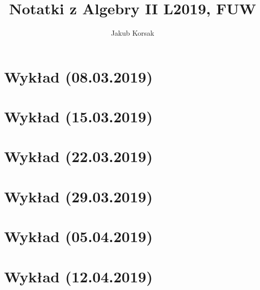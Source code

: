 \documentclass{article}
\title{Notatki z Algebry II L2019, FUW}
\author{Jakub Korsak}
\begin{document}
\maketitle

\pagebreak
\section{Wykład (08.03.2019)}

\pagebreak
\section{Wykład (15.03.2019)}

\pagebreak
\section{Wykład (22.03.2019)}

\pagebreak
\section{Wykład (29.03.2019)}

\pagebreak
\section{Wykład (05.04.2019)}

\pagebreak
\section{Wykład (12.04.2019)}

\end{document}
